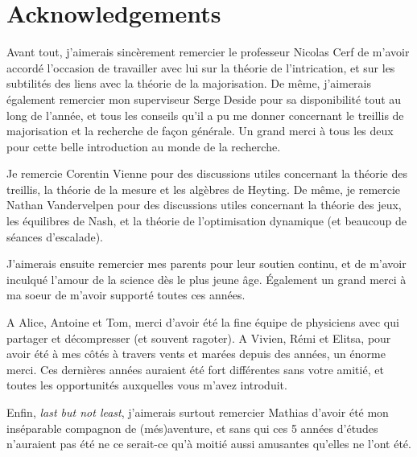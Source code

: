 \section*{Acknowledgements}

Avant tout, j'aimerais sincèrement remercier le professeur Nicolas Cerf de m'avoir accordé l'occasion de travailler avec lui sur la théorie de l'intrication, et sur les subtilités des liens avec la théorie de la majorisation. De même, j'aimerais également remercier mon superviseur Serge Deside pour sa disponibilité tout au long de l'année, et tous les conseils qu'il a pu me donner concernant le treillis de majorisation et la recherche de façon générale. Un grand merci à tous les deux pour cette belle introduction au monde de la recherche.

Je remercie Corentin Vienne pour des discussions utiles concernant la théorie des treillis, la théorie de la mesure et les algèbres de Heyting. De même, je remercie Nathan Vandervelpen pour des discussions utiles concernant la théorie des jeux, les équilibres de Nash, et la théorie de l'optimisation dynamique (et beaucoup de séances d'escalade).

J'aimerais ensuite remercier mes parents pour leur soutien continu, et de m'avoir inculqué l'amour de la science dès le plus jeune âge. \'Egalement un grand merci à ma soeur de m'avoir supporté toutes ces années.

A Alice, Antoine et Tom, merci d'avoir été la fine équipe de physiciens avec qui partager et décompresser (et souvent ragoter). A Vivien, Rémi et Elitsa, pour avoir été à mes côtés à travers vents et marées depuis des années, un énorme merci. Ces dernières années auraient été fort différentes sans votre amitié, et toutes les opportunités auxquelles vous m'avez introduit.

Enfin, \textit{last but not least}, j'aimerais surtout remercier Mathias d'avoir été mon inséparable compagnon de (més)aventure, et sans qui ces 5 années d'études n'auraient pas été ne ce serait-ce qu'à moitié aussi amusantes qu'elles ne l'ont été.

